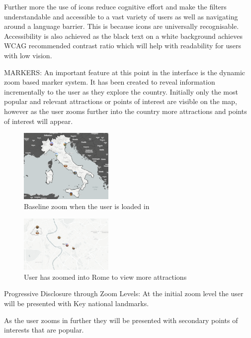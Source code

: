 \documentclass[]{project_final}
\begin{document}
Further more the use of icons reduce cognitive effort and make the filters understandable and accessible to a vast variety of users as well as navigating around a language barrier. This is because icons are universally recognisable. Accessibility is also achieved as the black text on a white background achieves WCAG recommended contrast ratio which will help with readability for users with low vision.

\newpage

MARKERS:
An important feature at this point in the interface is the dynamic zoom based marker system. It has been created to reveal information incrementally to the user as they explore the country. Initially only the most popular and relevant attractions or points of interest are visible on the map, however as the user zooms further into the country more attractions and points of interest will appear.

\begin{figure}[ht!]
  \centering
  \includegraphics[width=0.4\textwidth]{basezoom.png}
  \caption{Baseline zoom when the user is loaded in}
  \label{fig:1}
\end{figure}
\begin{figure}[ht!]
  \centering
  \includegraphics[width=0.4\textwidth]{biggerzoom.png}
  \caption{User has zoomed into Rome to view more attractions}
  \label{fig:1}
\end{figure}

Progressive Disclosure through Zoom Levels:
At the initial zoom level the user will be presented with Key national landmarks.


As the user zooms in further they will be presented with secondary points of interests that are popular.
\end{document}
